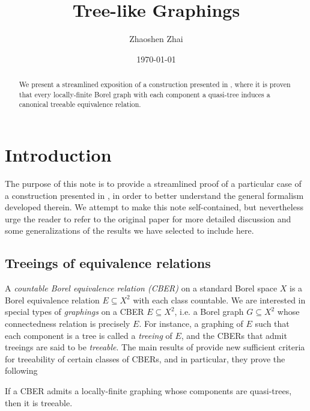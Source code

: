 \documentclass{amsart}
\begin{document}
    \title{Tree-like Graphings}
    \author{Zhaoshen Zhai}
    \date{\today}

    \begin{abstract}
        We present a streamlined exposition of a construction presented in \cite{CPTT23}, where it is proven that every locally-finite Borel graph with each component a quasi-tree induces a canonical treeable equivalence relation. {\color{red}{Write some more details...}}
    \end{abstract}

    \maketitle
    \vspace{-0.3in}

    \section{Introduction}

    The purpose of this note is to provide a streamlined proof of a particular case of a construction presented in \cite{CPTT23}, in order to better understand the general formalism developed therein. We attempt to make this note self-contained, but nevertheless urge the reader to refer to the original paper for more detailed discussion and some generalizations of the results we have selected to include here.

    \subsection{Treeings of equivalence relations}

    A \textit{countable Borel equivalence relation (CBER)} on a standard Borel space $X$ is a Borel equivalence relation $E\subseteq X^2$ with each class countable. We are interested in special types of \textit{graphings} on a CBER $E\subseteq X^2$, i.e. a Borel graph $G\subseteq X^2$ whose connectedness relation is precisely $E$. For instance, a graphing of $E$ such that each component is a tree is called a \textit{treeing} of $E$, and the CBERs that admit treeings are said to be \textit{treeable}. The main results of \cite{CPTT23} provide new sufficient criteria for treeability of certain classes of CBERs, and in particular, they prove the following

    \begin{mainTheorem}
        If a CBER admits a locally-finite graphing whose components are quasi-trees, then it is treeable.
    \end{mainTheorem}
\end{document}

